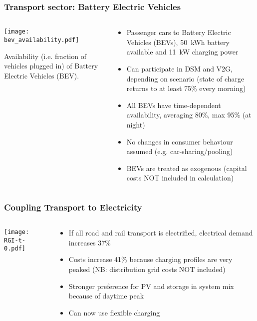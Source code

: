 \documentclass[10pt,aspectratio=169,dvipsnames]{beamer}
\let\olditem\item
\renewcommand{\item}{%
\olditem\vspace{5pt}}
\begin{document}
\begin{frame}
  \frametitle{Transport sector: Battery Electric Vehicles}
\begin{columns}[T]
\begin{column}{7cm}
    \texttt{[image: bev\_availability.pdf]}

    Availability (i.e. fraction of vehicles plugged in) of Battery Electric Vehicles (BEV).
\end{column}
\begin{column}{7cm}
  \begin{itemize}
  \item Passenger cars to Battery Electric Vehicles (BEVs), 50~kWh battery available and 11~kW charging power
  \item Can participate in DSM and V2G, depending on scenario (state of charge returns to at least 75\% every morning)
    \item All BEVs have time-dependent availability, averaging 80\%, max 95\% (at night)
    \item No changes in consumer behaviour assumed (e.g. car-sharing/pooling)
    \item BEVs are treated as exogenous (capital costs NOT included in calculation)
  \end{itemize}
\end{column}
\end{columns}

\end{frame}


\begin{frame}
  \frametitle{Coupling Transport to Electricity}
  \begin{columns}[T]
    \begin{column}{9cm}
      \texttt{[image: RGI-t-0.pdf]}


    \end{column}
    \begin{column}{5cm}
      \begin{itemize}
      \item If all road and rail transport is electrified, electrical demand increases 37\%
      \item Costs increase 41\% because charging profiles are very peaked (NB: distribution grid costs NOT included)
      \item Stronger preference for PV and storage in system mix because of daytime peak
      \item Can now use flexible charging
      \end{itemize}
    \end{column}
  \end{columns}
\end{frame}
\end{document}
